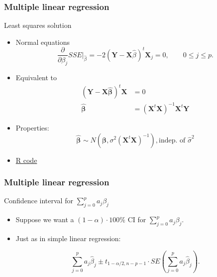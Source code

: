 \documentclass[handout]{beamer}
\newcommand{\Bh}[1]{\widehat{\beta}_{#1}}
\begin{document}

   \begin{frame} \frametitle{Multiple linear regression}

   \begin{block}
   {Least squares solution}
   \begin{itemize}
   \item Normal equations
   $$
   \frac{\partial}{\partial \beta_j} SSE \biggl|_{\Bh{}} = -2 \left(\pmb{Y} - \pmb{X} \Bh{} \right)^t \pmb{X}_j = 0, \qquad 0 \leq j \leq p.$$

   \item Equivalent to
   $$
   \begin{aligned}
   (\pmb{Y} - \pmb{X}\pmb{\Bh{}})^t\pmb{X} &= 0 \\
   \pmb{\Bh{}} &= (\pmb{X}^t\pmb{X})^{-1}\pmb{X}^t\pmb{Y}
   \end{aligned}
   $$

   \item Properties:
   $$
   \pmb{\Bh{}} \sim N\left(\pmb{\beta}, \sigma^2 (\pmb{X}^t \pmb{X})^{-1} \right), \text{indep. of $\widehat{\sigma}^2$}
   $$
   \item  \href{http://stats191.stanford.edu/multiple.html}{R code}
   \end{itemize}
   \end{block}
   \end{frame}


   \begin{frame} \frametitle{Multiple linear regression}

   \begin{block}
   {Confidence interval for $\sum_{j=0}^p a_j \beta_j$}
   \begin{itemize}
   \item Suppose we want  a $(1-\alpha)\cdot 100\%$ CI for $\sum_{j=0}^p a_j\beta_j$.

   \item Just as in simple linear regression:

   $$
   \sum_{j=0}^p a_j \widehat{\beta}_j \pm t_{1-\alpha/2, n-p-1} \cdot SE\left(\sum_{j=0}^p a_j\widehat{\beta}_j\right).$$
   \end{itemize}
   \end{block}
   \end{frame}

\end{document}
